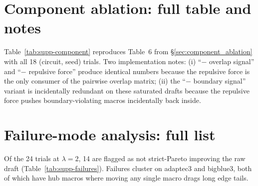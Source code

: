 \documentclass{article}
\begin{document}
\section{Component ablation: full table and notes}
\label{sec:supp-component}

Table~\ref{tab:supp-component} reproduces Table~6 from \S\ref{sec:component_ablation}
with all 18 (circuit, seed) trials.  Two implementation notes:
(i) ``$-$ overlap signal'' and ``$-$ repulsive force'' produce identical
numbers because the repulsive force is the only consumer of the pairwise
overlap matrix; (ii) the ``$-$ boundary signal'' variant is incidentally
redundant on these saturated drafts because the repulsive force pushes
boundary-violating macros incidentally back inside.

\begin{table}[h]
\centering
\small

\caption{Component ablation, mean $\pm$ std over 18 (circuit, seed) pairs.
Raw data: \texttt{results/vsr\_extra/component\_ablation.json}.}
\label{tab:supp-component}
\end{table}

\section{Failure-mode analysis: full list}
\label{sec:supp-failures}

Of the 24 trials at $\lambda=2$, 14 are flagged as not strict-Pareto
improving the raw draft (Table~\ref{tab:supp-failures}).  Failures cluster on
adaptec3 and bigblue3, both of which have hub macros where moving any single
macro drags long edge tails.
\end{document}
